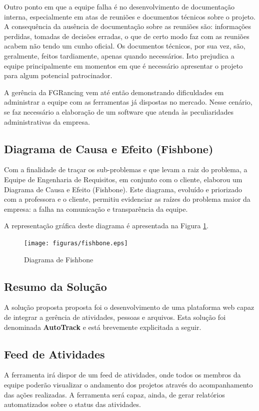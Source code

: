 Outro ponto em que a equipe falha é no desenvolvimento de documentação interna, especialmente em atas de reuniões e documentos
 técnicos sobre o projeto. A consequência da ausência de documentação sobre as reuniões são: informações perdidas, tomadas
  de decisões erradas, o que de certo modo faz com as reuniões acabem não tendo um cunho oficial. Os documentos técnicos,
  por sua vez, são, geralmente, feitos tardiamente, apenas quando necessários. Isto prejudica a equipe principalmente em
  momentos em que é necessário apresentar o projeto para algum potencial patrocinador.

A gerência da FGRancing vem até então demonstrando dificuldades em administrar a equipe com as ferramentas já dispostas
 no mercado. Nesse cenário, se faz necessário a elaboração de um software que atenda às peculiaridades	administrativas
  da empresa.

  \pagebreak
\subsection{Diagrama de Causa e Efeito (Fishbone)}
Com a finalidade de traçar os sub-problemas e que levam a raiz do problema, a Equipe de Engenharia de Requisitos, em conjunto com o cliente, elaborou um Diagrama de Causa e Efeito (Fishbone). Este diagrama, evoluído e priorizado com a professora e o cliente, permitiu evidenciar as raízes do problema maior da empresa: a falha na comunicação e transparência da equipe.

A representação gráfica deste diagrama é apresentada na Figura \ref{fishbone}.

\begin{figure}[!h]
        \centering
        \texttt{[image: figuras/fishbone.eps]}
        \caption{Diagrama de Fishbone\label{fishbone}}
\end{figure}


\subsection{Resumo da Solução}
A solução proposta proposta foi o desenvolvimento de uma plataforma web  capaz de integrar a gerência de atividades, pessoas e arquivos.
Esta solução foi denominada \textbf{AutoTrack} e está brevemente explicitada a seguir.

\subsection{Feed de Atividades}
A ferramenta irá dispor de um feed de atividades, onde todos os membros da equipe poderão visualizar o andamento
 dos projetos através do acompanhamento das ações realizadas. A ferramenta será capaz, ainda, de gerar
  relatórios automatizados sobre o status das atividades.

